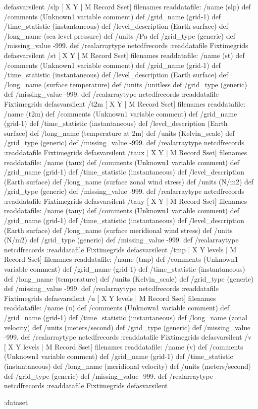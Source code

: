 \begin{ingrid}
{}defasvarsilent
 /slp{
[ X Y | M Record Sset] filenames readdatafile:
/name (slp) def
 /comments (Unknown1 variable comment) def
 /grid_name (grid-1) def
 /time_statistic (instantaneous) def
 /level_description (Earth surface) def
 /long_name (sea level pressure) def
 /units /Pa def
 /grid_type (generic) def
 /missing_value -999. def
 /realarraytype netcdfrecords :readdatafile Fixtimegrids
}defasvarsilent
 /st{
[ X Y | M Record Sset] filenames readdatafile:
/name (st) def
 /comments (Unknown1 variable comment) def
 /grid_name (grid-1) def
 /time_statistic (instantaneous) def
 /level_description (Earth surface) def
 /long_name (surface temperature) def
 /units /unitless def
 /grid_type (generic) def
 /missing_value -999. def
 /realarraytype netcdfrecords :readdatafile Fixtimegrids
}defasvarsilent
 /t2m{
[ X Y | M Record Sset] filenames readdatafile:
/name (t2m) def
 /comments (Unknown1 variable comment) def
 /grid_name (grid-1) def
 /time_statistic (instantaneous) def
 /level_description (Earth surface) def
 /long_name (temperature at 2m) def
 /units (Kelvin_scale) def
 /grid_type (generic) def
 /missing_value -999. def
 /realarraytype netcdfrecords :readdatafile Fixtimegrids
}defasvarsilent
 /taux{
[ X Y | M Record Sset] filenames readdatafile:
/name (taux) def
 /comments (Unknown1 variable comment) def
 /grid_name (grid-1) def
 /time_statistic (instantaneous) def
 /level_description (Earth surface) def
 /long_name (surface zonal wind stress) def
 /units (N/m2) def
 /grid_type (generic) def
 /missing_value -999. def
 /realarraytype netcdfrecords :readdatafile Fixtimegrids
}defasvarsilent
 /tauy{
[ X Y | M Record Sset] filenames readdatafile:
/name (tauy) def
 /comments (Unknown1 variable comment) def
 /grid_name (grid-1) def
 /time_statistic (instantaneous) def
 /level_description (Earth surface) def
 /long_name (surface meridional wind stress) def
 /units (N/m2) def
 /grid_type (generic) def
 /missing_value -999. def
 /realarraytype netcdfrecords :readdatafile Fixtimegrids
}defasvarsilent
 /tmp{
[ X Y levels | M Record Sset] filenames readdatafile:
/name (tmp) def
 /comments (Unknown1 variable comment) def
 /grid_name (grid-1) def
 /time_statistic (instantaneous) def
 /long_name (temperature) def
 /units (Kelvin_scale) def
 /grid_type (generic) def
 /missing_value -999. def
 /realarraytype netcdfrecords :readdatafile Fixtimegrids
}defasvarsilent
 /u{
[ X Y levels | M Record Sset] filenames readdatafile:
/name (u) def
 /comments (Unknown1 variable comment) def
 /grid_name (grid-1) def
 /time_statistic (instantaneous) def
 /long_name (zonal velocity) def
 /units (meters/second) def
 /grid_type (generic) def
 /missing_value -999. def
 /realarraytype netcdfrecords :readdatafile Fixtimegrids
}defasvarsilent
 /v{
[ X Y levels | M Record Sset] filenames readdatafile:
/name (v) def
 /comments (Unknown1 variable comment) def
 /grid_name (grid-1) def
 /time_statistic (instantaneous) def
 /long_name (meridional velocity) def
 /units (meters/second) def
 /grid_type (generic) def
 /missing_value -999. def
 /realarraytype netcdfrecords :readdatafile Fixtimegrids
}defasvarsilent
\end{ingrid}
\begin{ingrid}
:dataset
\end{ingrid}
